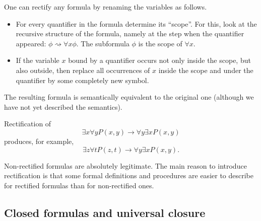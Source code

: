 \begin{page}
\setcounter{section}{1}
\setcounter{subsection}{2}
\setcounter{dfn}{5}
\label{portion:573}


One can rectify any formula by renaming the variables as follows.
\begin{itemize}
\item
For every quantifier in the formula determine its ``scope''.
For this, look at the recursive structure of the formula,
namely at the step when the quantifier appeared: $\phi \rightsquigarrow \forall x \phi$.
The subformula $\phi$ is the scope of $\forall x$.
\item
If the variable $x$ bound by a quantifier occurs not only inside the scope,
but also outside, then replace all occurrences of $x$ inside the scope and under the quantifier by some completely new symbol.
\end{itemize}

The resulting formula is semantically equivalent to the original one (although we have not yet described the semantics).


\end{page}

\begin{page}
\setcounter{section}{1}
\setcounter{subsection}{2}
\setcounter{dfn}{6}
\label{portion:575}

\begin{exl}
Rectification of
\[
\exists x \forall y P(x,y) \to \forall y \exists x P(x,y)
\]
produces, for example,
\[
\exists z \forall t P(z,t) \to \forall y \exists x P(x,y).
\]
\end{exl}

\end{page}

\begin{page}
\setcounter{section}{1}
\setcounter{subsection}{2}
\setcounter{dfn}{7}
\label{portion:578}

\begin{rem}
Non-rectified formulas are absolutely legitimate.
The main reason to introduce rectification is that
some formal definitions and procedures are easier to describe for rectified formulas than for non-rectified ones.
\end{rem}

\end{page}

\begin{page}
\setcounter{section}{1}
\setcounter{subsection}{3}
\setcounter{dfn}{7}
\label{portion:581}

\subsection{Closed formulas and universal closure}

\end{page}


